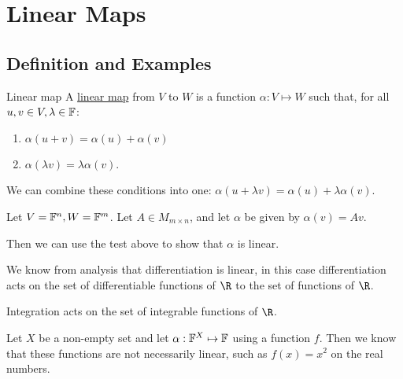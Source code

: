 \documentclass[../Main.tex]{subfiles}
\begin{document}
\section{Linear Maps}
\subsection{Definition and Examples}
\begin{definition}{Linear map}
    A \underline{linear map} from $V$ to $W$ is a function $\alpha : V \mapsto W$ such that, for all $u, v \in V, \lambda \in \mathbb{F}$:
    \begin{enumerate}
        \item $\alpha(u + v) = \alpha(u) + \alpha(v)$
        \item $\alpha(\lambda v) = \lambda \alpha(v)$.
    \end{enumerate}
\end{definition}
We can combine these conditions into one: $\alpha(u + \lambda v) = \alpha(u) + \lambda \alpha(v)$.

\begin{example}
    Let $V = \mathbb{F}^n, W = \mathbb{F}^m$. Let $A \in M_{m \times n}$, and let $\alpha$ be given by $\alpha(v) = Av$.

    Then we can use the test above to show that $\alpha$ is linear.
\end{example}
\begin{example}
    We know from analysis that differentiation is linear, in this case differentiation acts on the set of differentiable functions of $\R$ to the set of functions of $\R$.

    Integration acts on the set of integrable functions of $\R$.
\end{example}
\begin{example}
    Let $X$ be a non-empty set and let $\alpha : \mathbb{F}^X \mapsto \mathbb{F}$ using a function $f$. Then we know that these functions are not necessarily linear, such as $f(x) = x^2$ on the real numbers.
\end{example}
\end{document}
